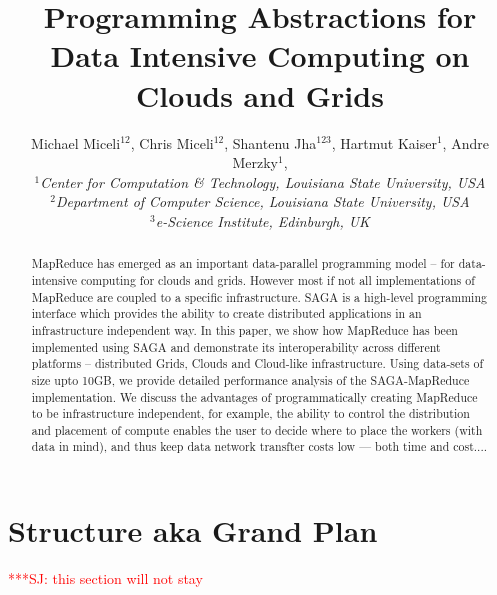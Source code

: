 \documentclass[conference,final]{IEEEtran}
\title{Programming Abstractions for Data Intensive Computing on Clouds and Grids}
\author{Michael Miceli$^{12}$, Chris Miceli$^{12}$, Shantenu
  Jha$^{123}$, Hartmut Kaiser$^{1}$, Andre Merzky$^{1}$, \\
  \small{\emph{$^{1}$Center for Computation \& Technology, Louisiana
      State University, USA}}\\
  \small{\emph{$^{2}$Department of Computer Science, Louisiana State
      University, USA}}\\
  \small{\emph{$^{3}$e-Science Institute, Edinburgh, UK}}\\
}
\newcommand{\jhanote}[1]{ {\textcolor{red} { ***SJ: #1 }}}
\newcommand{\jhanote}[1]{}
\begin{document}
\maketitle

\begin{abstract}
  MapReduce has emerged as an important data-parallel programming
  model -- for data-intensive computing for clouds and grids. However
  most if not all implementations of MapReduce are coupled to a
  specific infrastructure.  SAGA is a high-level programming interface
  which provides the ability to create distributed applications in an
  infrastructure independent way. In this paper, we show how MapReduce
  has been implemented using SAGA and demonstrate its interoperability
  across different platforms -- distributed Grids, Clouds and
  Cloud-like infrastructure. Using data-sets of size upto 10GB, we
  provide detailed performance analysis of the SAGA-MapReduce
  implementation.  We discuss the advantages of programmatically
  creating MapReduce to be infrastructure independent, for example,
  the ability to control the distribution and placement of compute
  enables the user to decide where to place the workers (with data in
  mind), and thus keep data network transfter costs low --- both time
  and cost....
\end{abstract}


\section*{Structure aka Grand Plan}\jhanote{this section will not
  stay}




\end{document}

